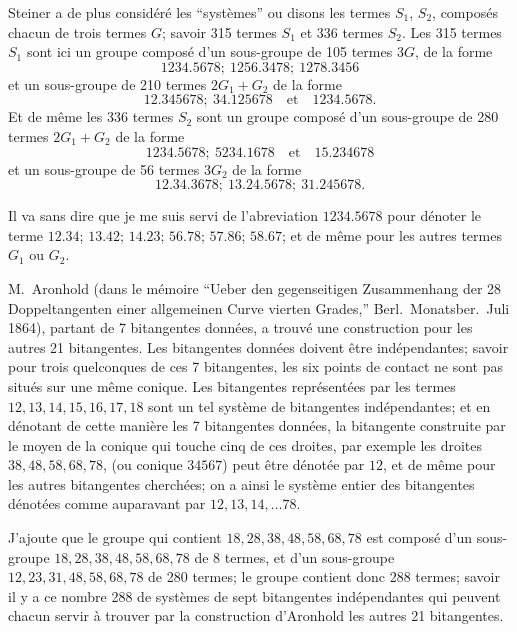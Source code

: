 \documentclass[11pt,a4paper]{article}
\begin{document}
Steiner a de plus consid\'{e}r\'{e} les ``syst\`{e}mes'' ou disons les termes $S_1$, $S_2$, compos\'{e}s chacun de trois termes $G$; savoir 315 termes $S_1$ et 336 termes $S_2$. Les 315 termes $S_1$ sont ici un groupe compos\'{e} d'un sous-groupe de 105 termes $3G$, de la forme
\[
1234.5678;\ 1256.3478;\ 1278.3456
\]
et un sous-groupe de 210 termes $2G_1 + G_2$ de la forme
\[
12.345678;\ 34.125678 \quad\text{et}\quad 1234.5678.
\]
Et de m\^{e}me les 336 termes $S_2$ sont un groupe compos\'{e} d'un sous-groupe de 280 termes $2G_1 + G_2$ de la forme
\[
1234.5678;\ 5234.1678 \quad\text{et}\quad 15.234678
\]
et un sous-groupe de 56 termes $3G_2$ de la forme
\[
12.34.3678;\ 13.24.5678;\ 31.245678.
\]

Il va sans dire que je me suis servi de l'abreviation $1234.5678$ pour d\'{e}noter le terme $12.34$; $13.42$; $14.23$; $56.78$; $57.86$; $58.67$; et de m\^{e}me pour les autres termes $G_1$ ou $G_2$.

M.~Aronhold (dans le m\'{e}moire ``Ueber den gegenseitigen Zusammenhang der 28 Doppeltangenten einer allgemeinen Curve vierten Grades,'' Berl.\ Monatsber.\ Juli 1864), partant de 7 bitangentes donn\'{e}es, a trouv\'{e} une construction pour les autres 21 bitangentes. Les bitangentes donn\'{e}es doivent \^{e}tre ind\'{e}pendantes; savoir pour trois quelconques de ces 7 bitangentes, les six points de contact ne sont pas situ\'{e}s sur une m\^{e}me conique. Les bitangentes repr\'{e}sent\'{e}es par les termes $12, 13, 14, 15, 16, 17, 18$ sont un tel syst\`{e}me de bitangentes ind\'{e}pendantes; et en d\'{e}notant de cette mani\`{e}re les 7 bitangentes donn\'{e}es, la bitangente construite par le moyen de la conique qui touche cinq de ces droites, par exemple les droites $38, 48, 58, 68, 78$, (ou conique $34567$) peut \^{e}tre d\'{e}not\'{e}e par $12$, et de m\^{e}me pour les autres bitangentes cherch\'{e}es; on a ainsi le syst\`{e}me entier des bitangentes d\'{e}not\'{e}es comme auparavant par $12, 13, 14, \ldots 78$.

J'ajoute que le groupe qui contient $18, 28, 38, 48, 58, 68, 78$ est compos\'{e} d'un sous-groupe $18, 28, 38, 48, 58, 68, 78$ de 8 termes, et d'un sous-groupe $12, 23, 31, 48, 58, 68, 78$ de 280 termes; le groupe contient donc 288 termes; savoir il y a ce nombre 288 de syst\`{e}mes de sept bitangentes ind\'{e}pendantes qui peuvent chacun servir \`{a} trouver par la construction d'Aronhold les autres 21 bitangentes.
\end{document}
